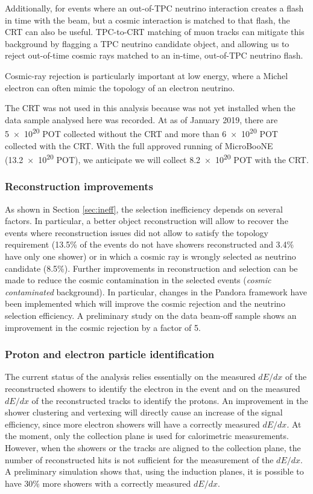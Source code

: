 Additionally, for events where an out-of-TPC neutrino interaction creates a flash in time with the beam, but a cosmic interaction is matched to that flash, the CRT can also be useful.  TPC-to-CRT matching of muon tracks can mitigate this background by flagging a TPC neutrino candidate object, and allowing us to reject out-of-time cosmic rays matched to an in-time, out-of-TPC neutrino flash.

Cosmic-ray rejection is particularly important at low energy, where a Michel electron can often mimic the topology of an electron neutrino. %

The CRT was not used in this analysis because was not yet installed when the data sample analysed here was recorded. At as of January 2019, there are \num{5e20} POT collected without the CRT and more than \num{6e20} POT collected with the CRT. With the full approved running of MicroBooNE (\num{13.2e20} POT), we anticipate we will collect \num{8.2e20} POT with the CRT.

\subsubsection*{Reconstruction improvements}
As shown in Section \ref{sec:ineff}, the selection inefficiency depends on several factors. In particular, a better object reconstruction will allow to recover the events where reconstruction issues did not allow to satisfy the topology requirement (13.5\% of the events do not have showers reconstructed and 3.4\% have only one shower) or in which a cosmic ray is wrongly selected as neutrino candidate (8.5\%). 
Further improvements in reconstruction and selection can be made to reduce the cosmic contamination in the selected events (\emph{cosmic contaminated} background).
In particular, changes in the Pandora framework have been implemented which will improve the cosmic rejection and the neutrino selection efficiency. A preliminary study on the data beam-off sample shows an improvement in the cosmic rejection by a factor of 5.

\subsubsection*{Proton and electron particle identification}
The current status of the analysis relies essentially on the measured $dE/dx$ of the reconstructed showers to identify the electron in the event and on the measured $dE/dx$ of the reconstructed tracks to identify the protons. An improvement in the shower clustering and vertexing will directly cause an increase of the signal efficiency, since more electron showers will have a correctly measured $dE/dx$. 
At the moment, only the collection plane is used for calorimetric measurements. However, when the showers or the tracks are aligned to the collection plane, the number of reconstructed hits is not sufficient for the measurement of the $dE/dx$. A preliminary simulation shows that, using the induction planes, it is possible to have 30\% more showers with a correctly measured $dE/dx$.

